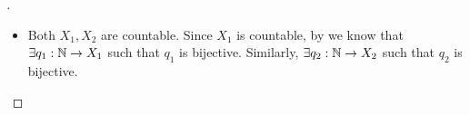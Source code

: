 \begin{proof}[]
\begin{itemize}
\begin{align*}
                                      & \quad + \sum_{n = 0}^\infty \abs{f\big(q_2(n)\big)}                                                  &  & \by{i:7.2.14.d} \\
                                      & = \sum_{x \in X_1} \abs{f(x)}                                                                        &  & \by{i:7.1.6}    \\
                                      & \quad + \sum_{x \in X_2} \abs{f\big(q(n)\big)}                                                       &  & \by{i:8.2.1}
          \end{align*}
          and thus both \(\sum_{x \in X_1} f(x)\) and \(\sum_{x \in X_2} f(x)\) are absolutely convergent.
          This implies
          \begin{align*}
            \sum_{x \in X} f(x) & = \sum_{n = 0}^\infty f(q(x))                                                            &  & \by{i:8.2.1}    \\
                                & = \sum_{n = 0}^{\#(X_1) - 1} f\big(q(n)\big) + \sum_{n = \#(X_1)}^\infty f\big(q(n)\big) &  & \by{i:7.2.14.c} \\
                                & = \sum_{n = 0}^{\#(X_1) - 1} f\big(q_1(n + 1)\big)                                                            \\
                                & \quad + \sum_{n = \#(X_1)}^\infty f\Big(q_2\big(n - \#(X_1)\big)\Big)                                         \\
                                & = \sum_{n = 1}^{\#(X_1)} f\big(q_1(n)\big)                                               &  & \by{i:7.1.4.b}  \\
                                & \quad + \sum_{n = 0}^\infty f\big(q_2(n)\big)                                            &  & \by{i:7.2.14.c} \\
                                & = \sum_{x \in X_1} f(x)                                                                  &  & \by{i:7.1.6}    \\
                                & \quad + \sum_{x \in X_2} f\big(q(n)\big).                                                &  & \by{i:8.2.1}
          \end{align*}
    \item Both \(X_1, X_2\) are countable.
          Since \(X_1\) is countable, by  we know that \(\exists q_1 : \mathbb{N} \to X_1\) such that \(q_1\) is bijective.
          Similarly, \(\exists q_2 : \mathbb{N} \to X_2\) such that \(q_2\) is bijective.

\end{itemize}
\end{proof}
